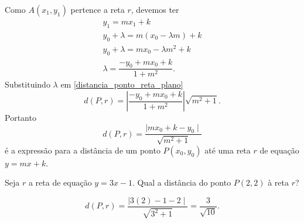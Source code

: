 Como $A(x_1, y_1)$ pertence a reta $r$, devemos ter
\begin{align*}
  y_1 = mx_1 + k\\
  y_0 + \lambda = m(x_0 - \lambda m) + k\\
  y_0 + \lambda = mx_0 - \lambda m^2 + k\\
  \lambda = \dfrac{-y_0 + mx_0 + k}{1 + m^2}.
\end{align*}
Substituindo $\lambda$ em \eqref{distancia_ponto_reta_plano}
\[
  d(P, r) = \left|\dfrac{-y_0 + mx_0 + k}{1 + m^2}\right|\sqrt{m^2 + 1}.
\]
Portanto
\[
  d(P, r) = \dfrac{\mid mx_0 + k - y_0\mid}{\sqrt{m^2 + 1}}
\]
\'e a express\~ao para a dist\^ancia de um ponto $P(x_0,y_0)$ at\'e uma reta $r$ de equa\c{c}\~ao $y = mx + k$.

\begin{exemplos}
  Seja $r$ a reta de equa\c{c}\~ao $y = 3x - 1$. Qual a dist\^ancia do ponto $P(2,2)$ \`a reta $r$?
  \begin{solucao}
    \[
      d(P,r) = \dfrac{\mid 3(2) - 1 - 2\mid}{\sqrt{3^2 + 1}} = \dfrac{3}{\sqrt{10}}.
    \]
  \end{solucao}
\end{exemplos}



